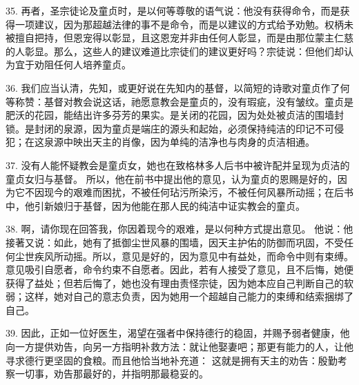 35. 再者，圣宗徒论及童贞时，是以何等尊敬的语气说：他没有获得命令，而是获得一项建议，因为那超越法律的事不是命令，而是以建议的方式给予劝勉。权柄未被擅自把持，但恩宠得以彰显，且这恩宠并非由任何人彰显，而是由那位蒙主仁慈的人彰显。那么，这些人的建议难道比宗徒们的建议更好吗？宗徒说：但他们却认为宜于劝阻任何人培养童贞。\par

36. 我们应当认清，先知，或更好说在先知内的基督，以简短的诗歌对童贞作了何等称赞：基督对教会说这话，祂愿意教会是童贞的，没有瑕疵，没有皱纹。童贞是肥沃的花园，能结出许多芬芳的果实。是关闭的花园，因为处处被贞洁的围墙封锁。是封闭的泉源，因为童贞是端庄的源头和起始，必须保持纯洁的印记不可侵犯；在这泉源中映出天主的肖像，因为单纯的洁净也与肉身的贞洁相通。\par

37. 没有人能怀疑教会是童贞女，她也在致格林多人后书中被许配并呈现为贞洁的童贞女归与基督。 所以，他在前书中提出他的意见，认为童贞的恩赐是好的，因为它不因现今的艰难而困扰，不被任何玷污所染污，不被任何风暴所动摇；在后书中，他引新娘归于基督，因为他能在那人民的纯洁中证实教会的童贞。\par

38. 啊，请你现在回答我，你因着现今的艰难，是以何种方式提出意见。 他说：他接著又说：如此，她有了抵御尘世风暴的围墙，因天主护佑的防御而巩固，不受任何尘世疾风所动摇。所以，意见是好的，因为意见中有益处，而命令中则有束缚。意见吸引自愿者，命令约束不自愿者。因此，若有人接受了意见，且不后悔，她便获得了益处；但若后悔了，她也没有理由责怪宗徒，因为她本应自己判断自己的软弱；这样，她对自己的意志负责，因为她用一个超越自己能力的束缚和结索捆绑了自己。\par

39. 因此，正如一位好医生，渴望在强者中保持德行的稳固，并赐予弱者健康，他向一方提供劝告，向另一方指明补救方法：就让他娶妻吧；那更有能力的人，让他寻求德行更坚固的食粮。而且他恰当地补充道： 这就是拥有天主的劝告：殷勤考察一切事，劝告那最好的，并指明那最稳妥的。\par

